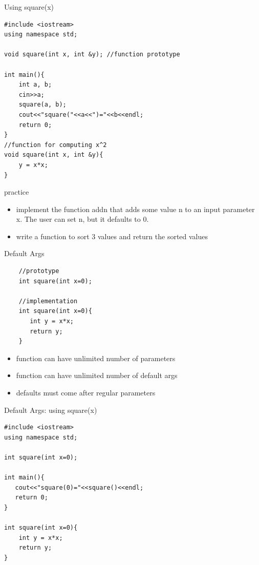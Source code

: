 \documentclass[xcolor={dvipsnames}]{beamer}
\begin{document}
\begin{frame}[fragile]{Using square(x)}

\begin{verbatim}
#include <iostream>
using namespace std;

void square(int x, int &y); //function prototype

int main(){
    int a, b;
    cin>>a;
    square(a, b);
    cout<<"square("<<a<<")="<<b<<endl;
    return 0;
}
//function for computing x^2
void square(int x, int &y){
    y = x*x;
}   
\end{verbatim}

\end{frame}

\begin{frame}{practice}
	\begin{itemize}
		\item implement the function addn that adds some value n to an input parameter x. The user can set n, but it defaults to 0.
		\item write a function to sort 3 values and return the sorted values
	\end{itemize}
\end{frame}

\begin{frame}[fragile]{Default Args}
	\begin{center}
	\begin{verbatim}
	//prototype
	int square(int x=0);

	//implementation
	int square(int x=0){
	   int y = x*x;
	   return y;
	}   
	\end{verbatim}
	\end{center}
	\begin{center}
	\begin{itemize}
		\item function can have unlimited number of parameters
		\item function can have unlimited number of default args
		\item defaults must come after regular parameters
	\end{itemize}
	\end{center}
\end{frame}

\begin{frame}[fragile]{Default Args: using square(x)}

\begin{verbatim}
#include <iostream>
using namespace std;

int square(int x=0);

int main(){
   cout<<"square(0)="<<square()<<endl;
   return 0;
}

int square(int x=0){
    int y = x*x;
    return y;
}   
\end{verbatim}

\end{frame}
\end{document}

